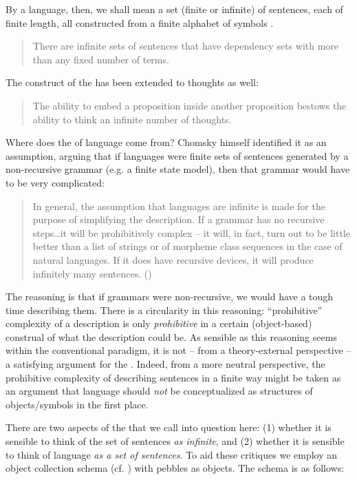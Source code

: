 By a language, then, we shall mean a set (finite or infinite) of sentences, each of finite length, all constructed from a finite alphabet of symbols \citep[114]{Chomsky1956}.

\begin{quote}
    There are infinite sets of sentences that have dependency sets with more than any fixed number of terms. \citep[115]{Chomsky1956}
    \end{quote}

The construct of the  has been extended to thoughts as well:

\begin{quote}
The ability to embed a proposition inside another proposition bestows the ability to think an infinite number of thoughts. \citep[125]{Pinker1999} 
\end{quote}

  Where does the  of language come from? Chomsky himself identified it as an assumption, arguing that if languages were finite sets of sentences generated by a non-recursive grammar (e.g. a finite state model), then that grammar would have to be very complicated:
  
\begin{quote}
In general, the assumption that languages are infinite is made for the purpose of simplifying the description. If a grammar has no recursive steps\ldots it will be prohibitively complex -- it will, in fact, turn out to be little better than a list of strings or of morpheme class sequences in the case of natural languages. If it does have recursive devices, it will produce infinitely many sentences. (\citeyear[115--116]{Chomsky1956})
\end{quote}

  The reasoning is that if grammars were non-recursive, we would have a tough time describing them. There is a circularity in this reasoning: “prohibitive” complexity of a description is only \textit{prohibitive} in a certain (object-based) construal of what the description could be. As sensible as this reasoning seems within the conventional paradigm, it is not -- from a theory-external perspective -- a satisfying argument for the . Indeed, from a more neutral perspective, the prohibitive complexity of describing sentences in a finite way might be taken as an argument that language should \textit{not} be conceptualized as structures of objects/symbols in the first place.

  There are two aspects of the  that we call into question here: 
  (1) whether it is sensible to think of the set of sentences \textit{as infinite}, and 
  (2) whether it is sensible to think of language \textit{as a set of sentences}. To aid these critiques we employ an object collection schema (cf. \citealt{LakoffNúñez2000}) with pebbles as objects. The schema is as follows: 

